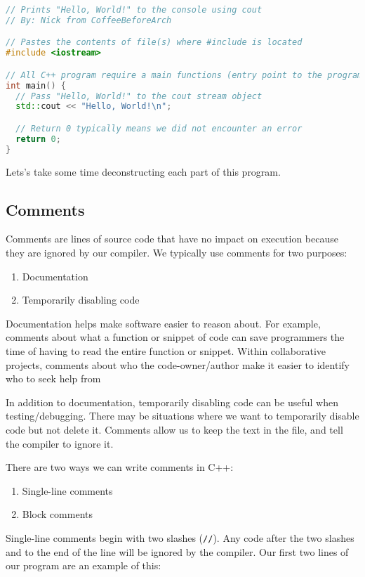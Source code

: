\documentclass[11pt,fancy,authoryear]{elegantbook}
\begin{document}
\begin{lstlisting}[language=C++]
// Prints "Hello, World!" to the console using cout
// By: Nick from CoffeeBeforeArch

// Pastes the contents of file(s) where #include is located
#include <iostream>

// All C++ program require a main functions (entry point to the program)
int main() {
  // Pass "Hello, World!" to the cout stream object
  std::cout << "Hello, World!\n";

  // Return 0 typically means we did not encounter an error
  return 0;
}
\end{lstlisting}

Lets's take some time deconstructing each part of this program.

\subsection{Comments}

Comments are lines of source code that have no impact on execution because they are ignored by our compiler. We typically use comments for two purposes:

\begin{enumerate}
  \item Documentation
  \item Temporarily disabling code
\end{enumerate}

Documentation helps make software easier to reason about. For example, comments about what a function or snippet of code can save programmers the time of having to read the entire function or snippet. Within collaborative projects, comments about who the code-owner/author make it easier to identify who to seek help from

In addition to documentation, temporarily disabling code can be useful when testing/debugging. There may be situations where we want to temporarily disable code but not delete it. Comments allow us to keep the text in the file, and tell the compiler to ignore it.

There are two ways we can write comments in C++:

\begin{enumerate}
  \item Single-line comments
  \item Block comments
\end{enumerate}

Single-line comments begin with two slashes (\lstinline{//}). Any code after the two slashes and to the end of the line will be ignored by the compiler. Our first two lines of our program are an example of this:
\end{document}
